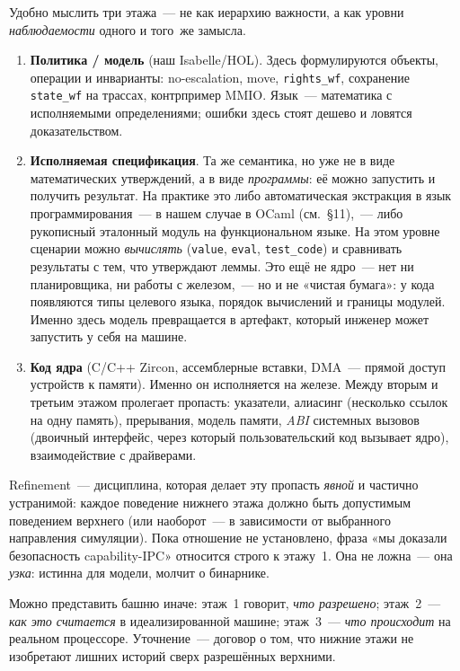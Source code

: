 \documentclass[11pt,a4paper]{article}
\begin{document}
Удобно мыслить три этажа~--- не как иерархию важности, а как уровни
\emph{наблюдаемости} одного и того~же замысла.
\begin{enumerate}[leftmargin=1.4em]
	\item \textbf{Политика / модель} (наш Isabelle/HOL).
	      Здесь формулируются объекты, операции и инварианты:
	      no-escalation, move, \texttt{rights\_wf}, сохранение
	      \texttt{state\_wf} на трассах, контрпример MMIO.
	      Язык~--- математика с исполняемыми определениями; ошибки здесь
	      стоят дешево и ловятся доказательством.
	\item \textbf{Исполняемая спецификация}.
	      Та же семантика, но уже не в виде математических утверждений,
	      а в виде \emph{программы}: её можно запустить и получить
	      результат. На практике это либо автоматическая экстракция в
	      язык программирования~--- в нашем случае в OCaml (см.~§11),~---
	      либо рукописный эталонный модуль на функциональном языке.
	      На этом уровне сценарии можно \emph{вычислять}
	      (\texttt{value}, \texttt{eval}, \texttt{test\_code}) и сравнивать
	      результаты с тем, что утверждают леммы. Это ещё не ядро~---
	      нет ни планировщика, ни работы с железом,~--- но и не «чистая
	      бумага»: у кода появляются типы целевого языка, порядок
	      вычислений и границы модулей. Именно здесь модель превращается
	      в артефакт, который инженер может запустить у себя на машине.
	\item \textbf{Код ядра} (C/C++ Zircon, ассемблерные вставки, DMA~---
	      прямой доступ устройств к памяти). Именно он исполняется на
	      железе. Между вторым и третьим этажом пролегает пропасть:
	      указатели, алиасинг (несколько ссылок на одну память), прерывания,
	      модель памяти, \emph{ABI} системных вызовов (двоичный интерфейс,
	      через который пользовательский код вызывает ядро), взаимодействие
	      с драйверами.
\end{enumerate}
Refinement~--- дисциплина, которая делает эту пропасть \emph{явной} и
частично устранимой: каждое поведение нижнего этажа должно быть
допустимым поведением верхнего (или наоборот~--- в зависимости от
выбранного направления симуляции). Пока отношение не установлено, фраза
«мы доказали безопасность \textenglish{capability}-IPC» относится строго к этажу~1.
Она не ложна~--- она \emph{узка}: истинна для модели, молчит о бинарнике.

Можно представить башню иначе: этаж~1 говорит, \emph{что разрешено};
этаж~2~--- \emph{как это считается} в идеализированной машине; этаж~3~---
\emph{что происходит} на реальном процессоре. Уточнение~--- договор о том,
что нижние этажи не изобретают лишних историй сверх разрешённых верхними.
\end{document}
